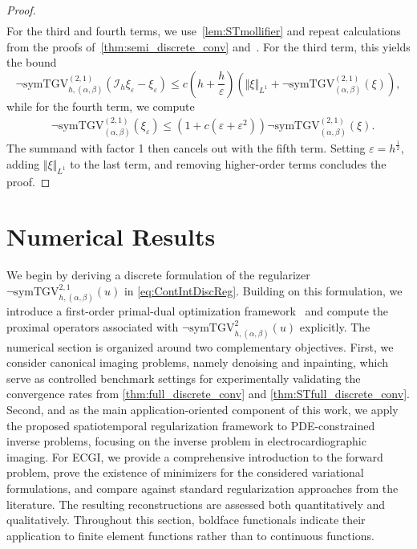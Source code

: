 \documentclass{article}
\newcommand{\NSymTGV}{\neg \mathrm{symTGV}}
\begin{document}
\begin{proof}
\begin{align*}
		\end{align*}
		For the third and fourth terms,  we use~\cref{lem:STmollifier} and repeat calculations from the proofs of~\cref{thm:semi_discrete_conv} and~\cite[Theorem~7.1]{Ba14}.
		For the third term, this yields the bound
		\begin{equation*}
			\NSymTGV_{h, (\alpha, \beta)}^{(2, 1)}(\mathcal{I}_h\xi_\varepsilon -\xi_\varepsilon) \leq c (h + \frac{h}{\varepsilon})\left(\Vert \xi \Vert_{L^1} + \NSymTGV_{(\alpha, \beta)}^{(2, 1)}(\xi)\right),
		\end{equation*}
		while for the fourth term, we compute
		\begin{align*}
			&\NSymTGV_{(\alpha, \beta)}^{(2, 1)}(\xi_\varepsilon) \leq(1 + c(\varepsilon + \varepsilon^2)) \NSymTGV_{(\alpha, \beta)}^{(2, 1)}(\xi).
		\end{align*}
		The summand with factor 1 then cancels out with the fifth term.
		Setting $\varepsilon = h^\frac{1}{2}$, adding $\Vert \xi \Vert_{L^1}$ to the last term, and removing higher-order terms concludes the proof.
	\end{proof}
	\section{Numerical Results}
	\label{sec:NumRes}
	We begin by deriving a discrete formulation of the regularizer $\NSymTGV_{h, (\alpha,\beta)}^{2,1}(u)$ in \eqref{eq:ContIntDiscReg}.
	Building on this formulation, we introduce a first-order primal-dual optimization framework~\cite{Ch11} and compute the proximal operators associated with $\NSymTGV_{h, (\alpha,\beta)}^2(u)$ explicitly.
	The numerical section is organized around two complementary objectives.
	First, we consider canonical imaging problems, namely denoising and inpainting, which serve as controlled benchmark settings for experimentally validating the convergence rates from \cref{thm:full_discrete_conv} and \cref{thm:STfull_discrete_conv}.
	Second, and as the main application-oriented component of this work, we apply the proposed spatiotemporal regularization framework to PDE-constrained inverse problems, focusing on the inverse problem in electrocardiographic imaging.
	For ECGI, we provide a comprehensive introduction to the forward problem, prove the existence of minimizers for the considered variational formulations, and compare against standard regularization approaches from the literature.
	The resulting reconstructions are assessed both quantitatively and qualitatively.
	Throughout this section, boldface functionals indicate their application to finite element functions rather than to continuous functions.
	
\end{document}
